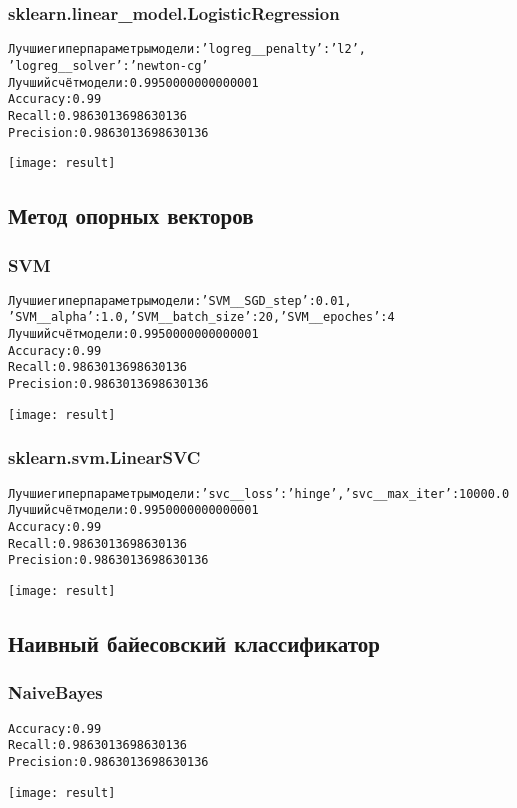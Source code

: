 \subsubsection{sklearn.linear\_model.LogisticRegression}
\begin{alltt}
Лучшие гиперпараметры модели: {'logreg__penalty': 'l2',
'logreg__solver': 'newton-cg'}
Лучший счёт модели: 0.9950000000000001
Accuracy: 0.99
Recall: 0.9863013698630136
Precision: 0.9863013698630136
\end{alltt}
\begin{center}
\texttt{[image: result]}
\end{center}
\pagebreak

\subsection{Метод опорных векторов}
\subsubsection{SVM}
\begin{alltt}
Лучшие гиперпараметры модели: {'SVM__SGD_step': 0.01,
'SVM__alpha': 1.0, 'SVM__batch_size': 20, 'SVM__epoches': 4}
Лучший счёт модели: 0.9950000000000001
Accuracy: 0.99
Recall: 0.9863013698630136
Precision: 0.9863013698630136
\end{alltt}
\begin{center}
\texttt{[image: result]}
\end{center}

\subsubsection{sklearn.svm.LinearSVC}
\begin{alltt}
Лучшие гиперпараметры модели: {'svc__loss': 'hinge', 'svc__max_iter': 10000.0}
Лучший счёт модели: 0.9950000000000001
Accuracy: 0.99
Recall: 0.9863013698630136
Precision: 0.9863013698630136
\end{alltt}
\begin{center}
\texttt{[image: result]}
\end{center}
\pagebreak

\subsection{Наивный байесовский классификатор}
\subsubsection{NaiveBayes}
\begin{alltt}
Accuracy: 0.99
Recall: 0.9863013698630136
Precision: 0.9863013698630136
\end{alltt}
\begin{center}
\texttt{[image: result]}
\end{center}

